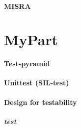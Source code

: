 \documentclass{beamer}
\begin{document}




\subsection{MISRA}

\part{MyPart}
\subsection{Test-pyramid}
\subsection{Unittest (SIL-test)}
\subsection{Design for testability}
\subsubsection{test}
\end{document}
